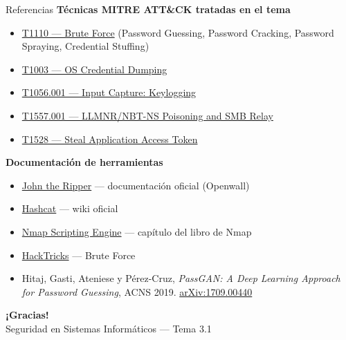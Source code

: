 \documentclass[aspectratio=169,11pt]{beamer}
\newcommand{\lead}[1]{{\bfseries #1}\par\medskip}
\begin{document}
\begin{frame}{Referencias}
\footnotesize
\lead{Técnicas MITRE ATT\&CK tratadas en el tema}
  \begin{itemize}
  \item \href{https://attack.mitre.org/techniques/T1110/}{T1110 --- Brute Force} (Password Guessing, Password Cracking, Password Spraying, Credential Stuffing)
  \item \href{https://attack.mitre.org/techniques/T1003/}{T1003 --- OS Credential Dumping}
  \item \href{https://attack.mitre.org/techniques/T1056/001/}{T1056.001 --- Input Capture: Keylogging}
  \item \href{https://attack.mitre.org/techniques/T1557/001/}{T1557.001 --- LLMNR/NBT-NS Poisoning and SMB Relay}
  \item \href{https://attack.mitre.org/techniques/T1528/}{T1528 --- Steal Application Access Token}
  \end{itemize}
\medskip
\lead{Documentación de herramientas}
  \begin{itemize}
  \item \href{https://www.openwall.com/john/doc/}{John the Ripper} --- documentación oficial (Openwall)
  \item \href{https://hashcat.net/wiki/}{Hashcat} --- wiki oficial
  \item \href{https://nmap.org/book/nse-usage.html}{Nmap Scripting Engine} --- capítulo del libro de Nmap
  \item \href{https://book.hacktricks.xyz/brute-force}{HackTricks} --- Brute Force
  \item Hitaj, Gasti, Ateniese y Pérez-Cruz, \emph{PassGAN: A Deep Learning Approach for Password Guessing}, ACNS 2019. \href{https://arxiv.org/abs/1709.00440}{arXiv:1709.00440}
  \end{itemize}
\end{frame}

\begin{frame}[plain]
  \begin{center}
    {\Huge\bfseries\color{uznavy} ¡Gracias!}\\[1em]
    {\large Seguridad en Sistemas Informáticos --- Tema 3.1}
  \end{center}
\end{frame}

\end{document}
